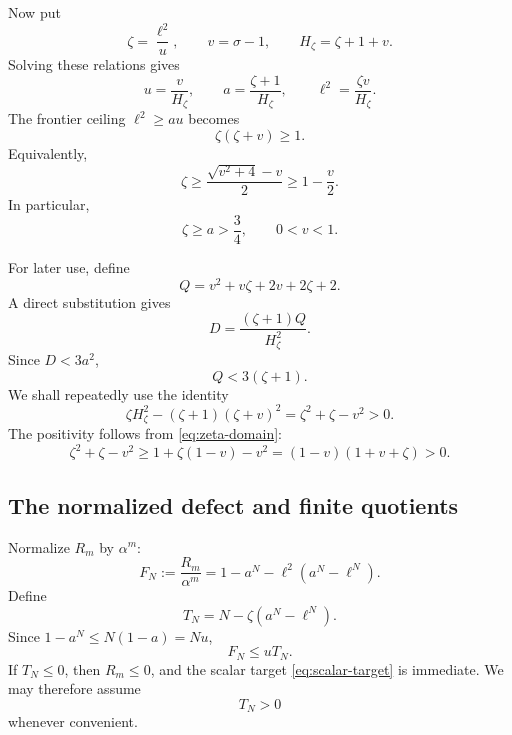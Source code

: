 \documentclass[11pt]{article}
\begin{document}
Now put
\begin{equation}\label{eq:zeta-v-def}
       \zeta=\frac{\ell^2}{u},
       \qquad v=\sigma-1,
       \qquad H_\zeta=\zeta+1+v.
\end{equation}
Solving these relations gives
\begin{equation}\label{eq:zeta-v-inverse}
       u=\frac v{H_\zeta},
       \qquad
       a=\frac{\zeta+1}{H_\zeta},
       \qquad
       \ell^2=\frac{\zeta v}{H_\zeta}.
\end{equation}
The frontier ceiling \(\ell^2\ge au\) becomes
\begin{equation}\label{eq:zeta-domain}
       \zeta(\zeta+v)\ge1.
\end{equation}
Equivalently,
\begin{equation}\label{eq:zeta-simple-lower}
       \zeta\ge\frac{\sqrt{v^2+4}-v}{2}\ge1-\frac v2.
\end{equation}
In particular,
\begin{equation}\label{eq:zeta-lower}
       \zeta\ge a>\frac34,
       \qquad 0<v<1.
\end{equation}

For later use, define
\begin{equation}\label{eq:Q-chart}
       Q=v^2+v\zeta+2v+2\zeta+2.
\end{equation}
A direct substitution gives
\begin{equation}\label{eq:D-Q}
       D=\frac{(\zeta+1)Q}{H_\zeta^2}.
\end{equation}
Since \(D<3a^2\),
\begin{equation}\label{eq:Q-upper}
       Q<3(\zeta+1).
\end{equation}
We shall repeatedly use the identity
\begin{equation}\label{eq:H-identity}
 \zeta H_\zeta^2-(\zeta+1)(\zeta+v)^2
 =\zeta^2+\zeta-v^2>0.
\end{equation}
The positivity follows from \eqref{eq:zeta-domain}:
\[
 \zeta^2+\zeta-v^2
 \ge1+\zeta(1-v)-v^2
 =(1-v)(1+v+\zeta)>0.
\]

\subsection{The normalized defect and finite quotients}

Normalize \(R_m\) by \(\alpha^m\):
\begin{equation}\label{eq:F-def}
       F_N:=\frac{R_m}{\alpha^m}
       =1-a^N-\ell^2(a^N-\ell^N).
\end{equation}
Define
\begin{equation}\label{eq:T-def}
       T_N=N-\zeta(a^N-\ell^N).
\end{equation}
Since \(1-a^N\le N(1-a)=Nu\),
\begin{equation}\label{eq:F-T}
       F_N\le uT_N.
\end{equation}
If \(T_N\le0\), then \(R_m\le0\), and the scalar target
\eqref{eq:scalar-target} is immediate.  We may therefore assume
\begin{equation}\label{eq:T-positive}
       T_N>0
\end{equation}
whenever convenient.
\end{document}
